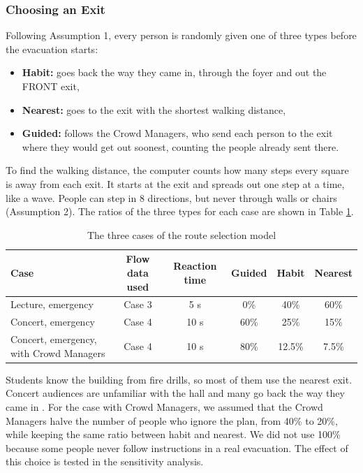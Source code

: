 \subsubsection{Choosing an Exit}
Following Assumption 1, every person is randomly given one of three types before the evacuation starts:
\begin{itemize}
    \item \textbf{Habit:} goes back the way they came in, through the foyer and out the FRONT exit,
    \item \textbf{Nearest:} goes to the exit with the shortest walking distance,
    \item \textbf{Guided:} follows the Crowd Managers, who send each person to the exit where they would get out soonest, counting the people already sent there.
\end{itemize}
To find the walking distance, the computer counts how many steps every square is away from each exit. It starts at the exit and spreads out one step at a time, like a wave. People can step in 8 directions, but never through walls or chairs (Assumption 2). The ratios of the three types for each case are shown in Table \ref{tab:cases}.

\begin{table}[H]
    \centering
    \small
    \caption{The three cases of the route selection model}
    \begin{tabular}{l|c|c|c|c|c}
        \toprule
        Case & Flow data used & Reaction time & Guided & Habit & Nearest \\
        \midrule
        Lecture, emergency & Case 3 & 5 s & 0\% & 40\% & 60\% \\
        Concert, emergency & Case 4 & 10 s & 60\% & 25\% & 15\% \\
        Concert, emergency, with Crowd Managers & Case 4 & 10 s & 80\% & 12.5\% & 7.5\% \\
        \bottomrule
    \end{tabular}
    \label{tab:cases}
\end{table}

Students know the building from fire drills, so most of them use the nearest exit. Concert audiences are unfamiliar with the hall and many go back the way they came in \cite{imanishi}. For the case with Crowd Managers, we assumed that the Crowd Managers halve the number of people who ignore the plan, from 40\% to 20\%, while keeping the same ratio between habit and nearest. We did not use 100\% because some people never follow instructions in a real evacuation. The effect of this choice is tested in the sensitivity analysis.

